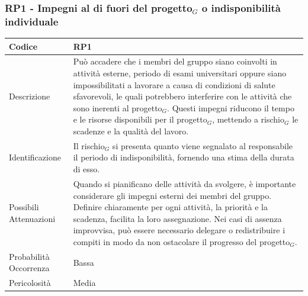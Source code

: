 \documentclass[10pt]{article}
\begin{document}
{    \subsubsection{RP1 - Impegni al di fuori del progetto$_G$ o indisponibilità individuale}
    \label{RP1}
    \begin{tabularx}{\textwidth}{|l|X|}
    \hline
    \rowcolor{gray!25}
    Codice & RP1 \\
    \hline
    Descrizione &  Può accadere che i membri del gruppo siano coinvolti in attività esterne, periodo di esami universitari oppure siano impossibilitati a lavorare a causa di condizioni di salute sfavorevoli, le quali potrebbero interferire con le attività che sono inerenti al progetto$_G$. Questi impegni riducono il tempo e le risorse disponibili per il progetto$_G$, mettendo a rischio$_G$ le scadenze e la qualità del lavoro. \\
    \hline
    Identificazione & Il rischio$_G$ si presenta quanto viene segnalato al responsabile il periodo di indisponibilità, fornendo una stima della durata di esso. \\
    \hline
    Possibili Attenuazioni &  Quando si pianificano delle attività da svolgere, è importante considerare gli impegni esterni dei membri del gruppo. Definire chiaramente per ogni attività, la priorità e la scadenza, facilita la loro assegnazione. Nei casi di assenza improvvisa, può essere necessario delegare o redistribuire i compiti in modo da non ostacolare il progresso del progetto$_G$. \\
    \hline
    Probabilità Occorrenza &  Bassa \\
    \hline
    Pericolosità & Media \\ 
    \hline
    \end{tabularx}
    

}
\end{document}
